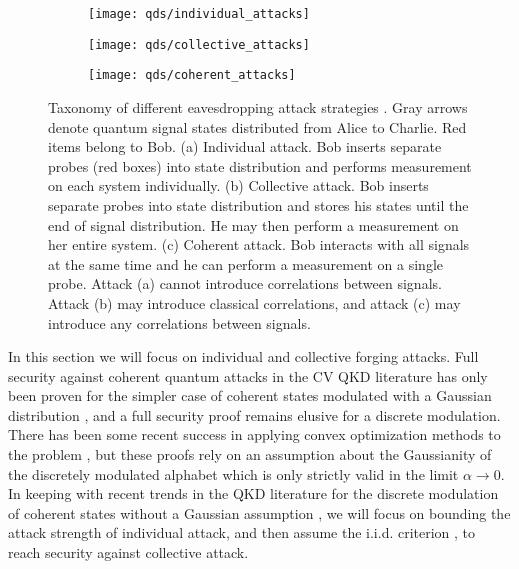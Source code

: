 \begin{figure}[htp]
\centering
	\begin{subfigure}{\linewidth}
		\centering
			\caption{\label{fig:types_of_attack_individual}}
		\texttt{[image: qds/individual\_attacks]}
	\end{subfigure}
	\begin{subfigure}{\linewidth}
		\centering
		\caption{\label{fig:types_of_attack_collective}}	
		\texttt{[image: qds/collective\_attacks]}
	\end{subfigure}
	\begin{subfigure}{\linewidth}
		\centering
		\caption{\label{fig:types_of_attack_coherent}}	
		\texttt{[image: qds/coherent\_attacks]}
	\end{subfigure}
\caption{\label{fig:types_of_attack} Taxonomy of different eavesdropping attack strategies \cite{Lutkenhaus2004}. Gray arrows denote quantum signal states distributed from Alice to Charlie. Red items belong to Bob. (a) Individual attack. Bob inserts separate probes (red boxes) into state distribution and performs measurement on each system individually. (b) Collective attack. Bob inserts separate probes into state distribution and stores his states until the end of signal distribution. He may then perform a measurement on her entire system. (c) Coherent attack. Bob interacts with all signals at the same time and he can perform a measurement on a single probe. Attack (a) cannot introduce correlations between signals. Attack (b) may introduce classical correlations, and attack (c) may introduce any correlations between signals.}
\end{figure}

In this section we will focus on individual and collective forging attacks. Full security against coherent quantum attacks in the CV QKD literature has only been proven for the simpler case of coherent states modulated with a Gaussian distribution \cite{Lodewyck2007, Leverrier2010c, Pirandola2008, Leverrier2015, Laudenbach2017, Furrer2012}, and a full security proof remains elusive for a discrete modulation. There has been some recent success in applying convex optimization methods to the problem \cite{Ghorai2019, Lin2019}, but these proofs rely on an assumption about the Gaussianity of the discretely modulated alphabet \cite{Leverrier2009} which is only strictly valid in the limit $\alpha \rightarrow 0$. In keeping with recent trends in the QKD literature for the discrete modulation of coherent states without a Gaussian assumption \cite{Papanastasiou2018}, we will focus on bounding the attack strength of individual attack, and then assume the i.i.d. criterion \cite{Leverrier2017, Laudenbach2017}, to reach security against collective attack. 

